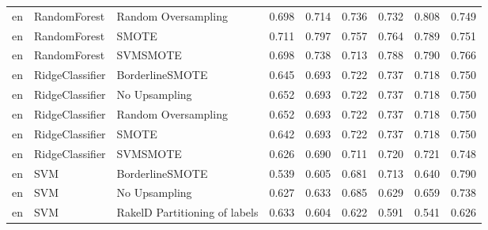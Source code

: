 \begin{tabular}{lllllllll}
      en &                    RandomForest &           Random Oversampling & 0.698 &                     0.714 &                 0.736 &                  0.732 &                                   0.808 &     0.749 \\
      en &                    RandomForest &                         SMOTE & 0.711 &                     0.797 &                 0.757 &                  0.764 &                                   0.789 &     0.751 \\
      en &                    RandomForest &                      SVMSMOTE & 0.698 &                     0.738 &                 0.713 &                  0.788 &                                   0.790 &     0.766 \\
      en &                 RidgeClassifier &               BorderlineSMOTE & 0.645 &                     0.693 &                 0.722 &                  0.737 &                                   0.718 &     0.750 \\
      en &                 RidgeClassifier &                 No Upsampling & 0.652 &                     0.693 &                 0.722 &                  0.737 &                                   0.718 &     0.750 \\
      en &                 RidgeClassifier &           Random Oversampling & 0.652 &                     0.693 &                 0.722 &                  0.737 &                                   0.718 &     0.750 \\
      en &                 RidgeClassifier &                         SMOTE & 0.642 &                     0.693 &                 0.722 &                  0.737 &                                   0.718 &     0.750 \\
      en &                 RidgeClassifier &                      SVMSMOTE & 0.626 &                     0.690 &                 0.711 &                  0.720 &                                   0.721 &     0.748 \\
      en &                             SVM &               BorderlineSMOTE & 0.539 &                     0.605 &                 0.681 &                  0.713 &                                   0.640 &     0.790 \\
      en &                             SVM &                 No Upsampling & 0.627 &                     0.633 &                 0.685 &                  0.629 &                                   0.659 &     0.738 \\
      en &                             SVM & RakelD Partitioning of labels & 0.633 &                     0.604 &                 0.622 &                  0.591 &                                   0.541 &     0.626 \\

\end{tabular}
